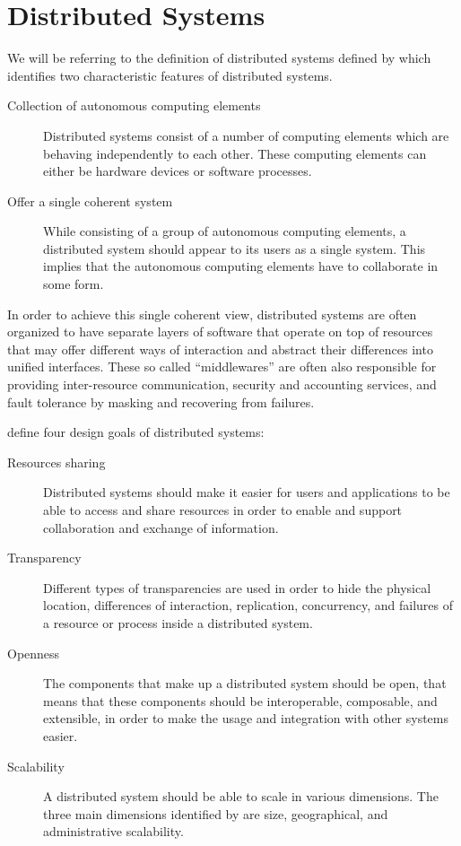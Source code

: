 \section{Distributed Systems}
\label{sec:distributed-systems}

We will be referring to the definition of distributed systems defined by
\citeauthor{tannenbaum2017} \cite{tannenbaum2017} which identifies two
characteristic features of distributed systems.

\begin{description}
  \item[Collection of autonomous computing elements]
    Distributed systems consist of a number of computing elements which are
    behaving independently to each other. These computing elements can either be
    hardware devices or software processes.
  \item[Offer a single coherent system]
    While consisting of a group of autonomous computing elements, a distributed
    system should appear to its users as a single system. This implies that the
    autonomous computing elements have to collaborate in some form.
\end{description}

In order to achieve this single coherent view, distributed systems are often
organized to have separate layers of software that operate on top of resources
that may offer different ways of interaction and abstract their differences into
unified interfaces. These so called ``middlewares'' are often also responsible
for providing inter-resource communication, security and accounting services,
and fault tolerance by masking and recovering from failures.

\citeauthor{tannenbaum2017} define four design goals of distributed systems:

\begin{description}
  \item[Resources sharing] 
    Distributed systems should make it easier for users and applications to be
    able to access and share resources in order to enable and support
    collaboration and exchange of information.
  \item[Transparency] 
    Different types of transparencies are used in order to hide the physical
    location, differences of interaction, replication, concurrency, and failures
    of a resource or process inside a distributed system.
  \item[Openness]
    The components that make up a distributed system should be open, that means
    that these components should be interoperable, composable, and extensible,
    in order to make the usage and integration with other systems easier.
  \item[Scalability]
    A distributed system should be able to scale in various dimensions. The
    three main dimensions identified by \citeauthor{neuman1994scale}
    \cite{neuman1994scale} are size, geographical, and administrative
    scalability.
\end{description}

